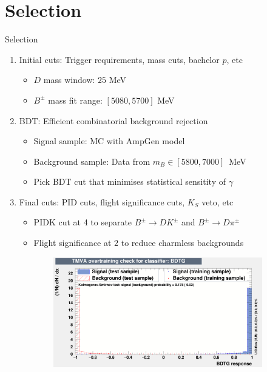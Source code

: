 \documentclass{beamer}
\begin{document}
\section{Selection}

\begin{frame}{Selection}
  \begin{enumerate}
    \setlength\itemsep{0.0em}
    \item{Initial cuts: Trigger requirements, mass cuts, bachelor $p$, etc}
    \begin{itemize}
      \item{$D$ mass window: $25$ MeV}
      \item{$B^\pm$ mass fit range: $[5080, 5700]$ MeV}
    \end{itemize}
    \item{BDT: Efficient combinatorial background rejection}
    \begin{itemize}
      \item{Signal sample: MC with AmpGen model}
      \item{Background sample: Data from $m_B\in[5800, 7000]$~MeV}
      \item{Pick BDT cut that minimises statistical sensitity of $\gamma$}
    \end{itemize}
    \item{Final cuts: PID cuts, flight significance cuts, $K_S$ veto, etc}
    \begin{itemize}
      \item{PIDK cut at 4 to separate $B^\pm\to DK^\pm$ and $B^\pm\to D\pi^\pm$}
      \item{Flight significance at $2$ to reduce charmless backgrounds}
    \end{itemize}
  \end{enumerate}
  \begin{figure}
    \centering
    \begin{subfigure}{0.4\textwidth}
      \includegraphics[width = 1.0\textwidth]{Plots/overtrain_BDTG.png}

\end{subfigure}
\end{figure}
\end{frame}
\end{document}
